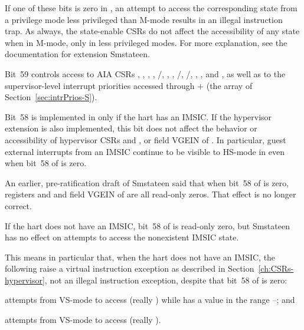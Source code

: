 If one of these bits is zero in
, an attempt to access
the corresponding state from a privilege mode less privileged
than \mbox{M-mode} results in an illegal instruction trap.
As always, the state-enable CSRs do not affect the accessibility
of any state when in \mbox{M-mode}, only in less privileged modes.
For more explanation, see the documentation for extension Smstateen.

Bit~59 controls access to AIA CSRs , , ,
, /, , ,
/, /, ,
, and , as well as to the supervisor-level interrupt
priorities accessed through  + 
(the  array of Section~\ref{sec:intrPrios-S}).

Bit~58 is implemented in 
only if the hart has an IMSIC.
If the hypervisor extension is also implemented, this bit does
not affect the behavior or accessibility of hypervisor CSRs
 and , or field VGEIN of .
In particular, guest external interrupts from an IMSIC
continue to be visible to \mbox{HS-mode} in 
even when bit~58 of  is zero.

\begin{commentary}
An earlier, pre-ratification draft of Smstateen said that when
bit~58 of  is zero, registers  and 
and field VGEIN of  are all read-only zeros.
That effect is no longer correct.
\end{commentary}

If the hart does not have an \mbox{IMSIC}, bit~58 of 
is read-only zero, but Smstateen has no effect on
attempts to access the nonexistent \mbox{IMSIC} state.

\begin{commentary}
This means in particular that, when the hart does not have an
\mbox{IMSIC}, the following raise a virtual instruction exception
as described in Section~\ref{ch:CSRs-hypervisor}, not an illegal
instruction exception, despite that bit~58 of\/  is zero:
\begin{tightList}
\item
attempts from \mbox{VS-mode} to access\/ 
(really\/ ) while\/  has
a value in the range\/ --; and
\item
attempts from \mbox{VS-mode} to access\/
 (really\/ ).
\end{tightList}
\end{commentary}

